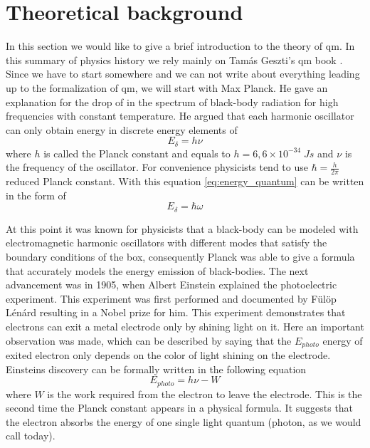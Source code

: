\section{Theoretical background}
\label{sec:theory}

In this section we would like to give a brief introduction to the theory of \acrshort{qm}. In this summary of physics history we rely mainly on Tamás Geszti's \acrshort{qm} book \cite{geszti2007}.
Since we have to start somewhere and we can not write about everything leading up to the formalization of \acrshort{qm}, we will start with Max Planck.
He gave an explanation for the drop of in the spectrum of black-body radiation for high frequencies with constant temperature.
He argued that each harmonic oscillator can only obtain energy in discrete energy elements of
\begin{equation}
	\label{eq:energy_quantum}
	E_\delta = h\nu
\end{equation}
where $h$ is called the Planck constant and equals to $h = 6,6 \times 10^{-34}\;Js$
and $\nu$ is the frequency of the oscillator.
For convenience physicists tend to use $\hbar = \frac{h}{2\pi}$ reduced Planck constant.
With this equation \ref{eq:energy_quantum} can be written in the form of
\begin{equation}
	E_\delta = \hbar\omega
\end{equation}

At this point it was known for physicists that a black-body can be modeled with electromagnetic harmonic oscillators with different modes that satisfy the boundary conditions of the box, consequently Planck was able to give a formula that accurately models the energy emission of black-bodies.
The next advancement was in 1905, when Albert Einstein explained the photoelectric experiment.
This experiment was first performed and documented by Fülöp Lénárd resulting in a Nobel prize for him.
This experiment demonstrates that electrons can exit a metal electrode only by shining light on it.
Here an important observation was made, which can be described by saying that the $E_{photo}$ energy of exited electron only depends on the color of light shining on the electrode.
Einsteins discovery can be formally written in the following equation
\begin{equation}
	E_{photo} = h\nu - W
\end{equation}
where $W$ is the work required from the electron to leave the electrode.
This is the second time the Planck constant appears in a physical formula.
It suggests that the electron absorbs the energy of one single light quantum (photon, as we would call today).

